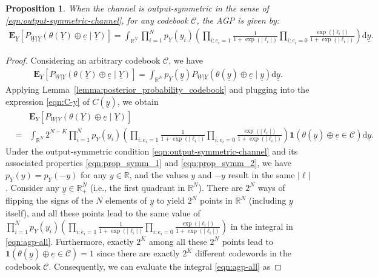 \documentclass[letterpaper,draftclsnofoot,onecolumn]{IEEEtran}
\newtheorem{proposition}{Proposition}
\begin{document}
\begin{proposition}\label{prop:agp}
    When the channel is output-symmetric in the sense of \eqref{eqn:output-symmetric-channel}, for any codebook $\mathcal{C}$, the AGP is given by:
    \begin{eqnarray}\label{eqn:agp}
        \mathbf{E}_{\underline{Y}} \left[P_{\underline{W}|\underline{Y}}(\theta(\underline{Y})\oplus \underline{e} \mid \underline{Y})\right] = \int_{\mathbb{R}^N}\prod_{i=1}^{N}p_{Y}(y_i) \left(\prod_{i:e_i = 1} \frac{1}{1+\exp(|\ell_i|)} \prod_{i:e_i = 0} \frac{\exp(|\ell_i|)} {1+\exp(|\ell_i|)}\right)\mathrm{d}\underline{y}.
    \end{eqnarray}
\end{proposition}
\begin{proof}
    Considering an arbitrary codebook $\mathcal{C}$, we have
    \begin{eqnarray}\label{eq:agp_expect2int}
        \mathbf{E}_{\underline{Y}} \left[P_{\underline{W}|\underline{Y}}(\theta(\underline{Y})\oplus \underline{e} \mid \underline{Y})\right] = \int_{\mathbb{R}^N} p_{\underline{Y}}(\underline{y}) P_{\underline{W}|\underline{Y}}(\theta(\underline{y})\oplus \underline{e} \mid \underline{y})
        \mathrm{d}\underline{y}.
    \end{eqnarray}
    Applying Lemma~\ref{lemma:posterior_probability_codebook} and plugging into the expression \eqref{eqn:C-y} of $C(\underline{y})$, we obtain
    \begin{eqnarray}
        && \mathbf{E}_{\underline{Y}} \left[P_{\underline{W}|\underline{Y}}(\theta(\underline{Y})\oplus \underline{e} \mid \underline{Y})\right]\\
        &=& \int_{\mathbb{R}^N} 2^{N - K} \prod_{i=1}^{N}p_{Y}(y_i) \left(\prod_{i:e_i = 1} \frac{1}{1+\exp(|\ell_i|)} \prod_{i:e_i = 0} \frac{\exp(|\ell_i|)} {1+\exp(|\ell_i|)}\right) \mathbf{1}\left(\theta(\underline{y}) \oplus \underline{e} \in \mathcal{C}\right) \mathrm{d}\underline{y}.\label{eqn:agp-all}
    \end{eqnarray}
    Under the output-symmetric condition \eqref{eqn:output-symmetric-channel} and its associated properties \eqref{eqn:prop_symm_1} and \eqref{eqn:prop_symm_2}, we have $p_Y(y) = p_Y(-y)$ for any $y \in \mathbb{R}$, and the values $y$ and $-y$ result in the same $|\ell|$. Consider any $\underline{y} \in \mathbb{R}_{+}^{N}$ (i.e., the first quadrant in $\mathbb{R}^N$). There are $2^N$ ways of flipping the signs of the $N$ elements of $\underline{y}$ to yield $2^N$ points in $\mathbb{R}^N$ (including $\underline{y}$ itself), and all these points lead to the same value of $\prod_{i=1}^{N}p_{Y}(y_i) \left(\prod_{i:e_i = 1} \frac{1}{1+\exp(|\ell_i|)} \prod_{i:e_i = 0} \frac{\exp(|\ell_i|)} {1+\exp(|\ell_i|)}\right)$ in the integral in \eqref{eqn:agp-all}. Furthermore, exactly $2^K$ among all these $2^N$ points lead to $\mathbf{1}\left(\theta(\underline{y}) \oplus \underline{e} \in \mathcal{C}\right) = 1$ since there are exactly $2^K$ different codewords in the codebook $\mathcal{C}$. Consequently, we can evaluate the integral \eqref{eqn:agp-all} as

\end{proof}
\end{document}

